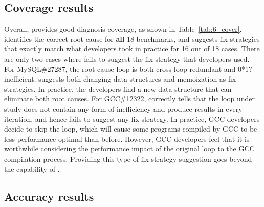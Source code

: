 \subsection{Coverage results}
\label{sec:6_coverage}
Overall, \Tool provides good diagnosis coverage, as shown in Table~\ref{tab:6_cover}. 
\Tool identifies the correct root cause for \textbf{all} 18 benchmarks, and 
suggests fix strategies that exactly match what developers took in practice
for 16 out of 18 cases. There are only two cases where \Tool fails to suggest
the fix strategy that developers used. For MySQL\#27287, the root-cause loop
is both cross-loop redundant and 0*1? inefficient. \Tool suggests both changing
data structures and memoization as fix strategies. In practice, the developers
find a new data structure that can eliminate both root causes.
For GCC\#12322, \Tool correctly tells that the loop under study
does not contain any form of inefficiency and produce results in every 
iteration, and hence fails to suggest any fix strategy. In practice, GCC
developers decide to skip the loop, which will cause some programs compiled by
GCC
to be less performance-optimal than before. However, GCC developers feel
that it is worthwhile considering the performance impact of the original loop
to the GCC compilation process.
Providing this type of
fix strategy suggestion goes beyond the capability of \Tool.

\subsection{Accuracy results}
\label{sec:6_result_acc}

